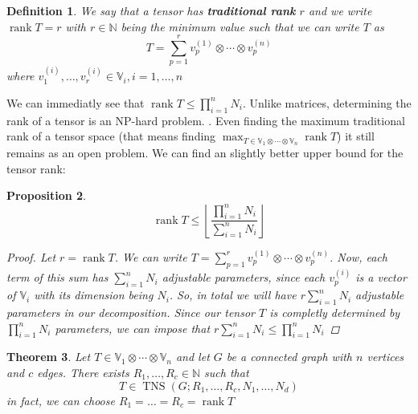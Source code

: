 \documentclass[11pt,a4paper,openright,oneside]{book}
\numberwithin{equation}{section}
\newtheorem{defn0}{Definition}[chapter]
\newtheorem{prop0}[defn0]{Proposition}
\newtheorem{thm0}[defn0]{Theorem}
\newenvironment{definition}{ \begin{defn0}}{\end{defn0}}
\newenvironment{proposition}{\bigskip \begin{prop0}}{\end{prop0}}
\newenvironment{theorem}{\bigskip \begin{thm0}}{\end{thm0}}
\DeclareMathOperator{\rank}{rank}
\DeclareMathOperator{\TNS}{TNS}
\begin{document}
\begin{definition} 
    We say that a tensor has \textbf{traditional rank} $r$ and we write $\rank{T} = r$
    with $r \in \mathbb{N}$ being the minimum value such that we can write $T$ as
$$T= \sum_{p=1}^r v_p^{(1)} \otimes \cdots \otimes v_p^{(n)}$$
where $v_1^{(i)}, \dots, v_r^{(i)} \in \mathbb{V}_i, i = 1, \dots, n$
\end{definition}

We can immediatly see that $\rank{T} \leqslant \prod_{i=1}^n N_i$.
Unlike matrices, determining the rank of a tensor is an NP-hard problem. \cite{hillarMostTensorProblems2013}. Even
finding the maximum traditional rank of a tensor space (that means finding $\max_{T \in \mathbb{V}_1 \otimes \cdots \otimes \mathbb{V}_n} \rank{T}$) it still remains as an open problem.
We can find an slightly better upper bound for the tensor rank:
\begin{proposition}
    \begin{equation} \label{eq:rank-dimensional-bound}
        \rank{T} \leqslant \left\lfloor \frac{\prod_{i=1}^n N_i}{\sum_{i=1}^n N_i} \right\rfloor
    \end{equation}

\begin{proof}
    Let $r = \rank{T}$. We can write $T = \sum_{p=1}^r v_p^{(1)} \otimes \cdots \otimes v_p^{(n)}$. Now, each term of this
    sum has $\sum_{i=1}^n N_i$ adjustable parameters, since each $v_p^{(i)}$ is a vector of $\mathbb{V}_i$ with its dimension being $N_i$.
    So, in total we will have $r \sum_{i=1}^n N_i$ adjustable parameters in our decomposition. Since our tensor $T$ is completly
    determined by $\prod_{i=1}^n N_i$ parameters, we can impose that $r \sum_{i=1}^n N_i \leqslant \prod_{i=1}^n N_i$ 
\end{proof}
\end{proposition}

\begin{theorem}  Let $T \in \mathbb{V}_1 \otimes \cdots \otimes \mathbb{V}_n$ and let $G$ be a connected graph with $n$ vertices and $c$ edges.
    There exists $R_1, \dots, R_c \in \mathbb{N}$ such that
    $$T \in \TNS(G; R_1, \dots, R_c, N_1, \dots, N_d)$$
    in fact, we can choose $R_1 = \dots = R_c = \rank{T}$
    \label{thm:finiterank}
\end{theorem}
\end{document}
